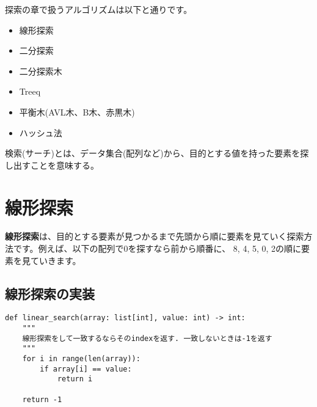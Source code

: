 探索の章で扱うアルゴリズムは以下と通りです。

\begin{itemize}
  \item 線形探索
  \item 二分探索
  \item 二分探索木
  \item Treeq
  \item 平衡木(AVL木、B木、赤黒木)
  \item ハッシュ法
\end{itemize}

検索(サーチ)とは、データ集合(配列など)から、目的とする値を持った要素を探し出すことを意味する。

\section{線形探索}

\textbf{線形探索}は、目的とする要素が見つかるまで先頭から順に要素を見ていく探索方法です。例えば、以下の配列で0を探すなら前から順番に、
8, 4, 5, 0, 2の順に要素を見ていきます。

\vspace{0.5cm}

\begin{center}
\end{center}

\subsection{線形探索の実装}
\begin{lstlisting}[caption=線形探索の実装, frame=TRBL, label={linear}]
def linear_search(array: list[int], value: int) -> int:
    """
    線形探索をして一致するならそのindexを返す. 一致しないときは-1を返す
    """
    for i in range(len(array)):
        if array[i] == value:
            return i
    
    return -1


\end{lstlisting}

